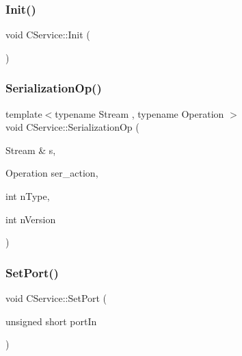 \subsubsection{\texorpdfstring{Init()}{Init()}}
{\footnotesize\ttfamily void C\+Service\+::\+Init (\begin{DoxyParamCaption}{ }\end{DoxyParamCaption})}

\mbox{\label{class_c_service_a0673ebec7bdc8558ce3fe1d63ea4d2e1}} 
\subsubsection{\texorpdfstring{Serialization\+Op()}{SerializationOp()}}
{\footnotesize\ttfamily template$<$typename Stream , typename Operation $>$ \\
void C\+Service\+::\+Serialization\+Op (\begin{DoxyParamCaption}\item[{Stream \&}]{s,  }\item[{Operation}]{ser\+\_\+action,  }\item[{int}]{n\+Type,  }\item[{int}]{n\+Version }\end{DoxyParamCaption})\hspace{0.3cm}{\ttfamily [inline]}}

\mbox{\label{class_c_service_a3dedc3f12aa21bdbf1068b054d3e3d39}} 
\subsubsection{\texorpdfstring{Set\+Port()}{SetPort()}}
{\footnotesize\ttfamily void C\+Service\+::\+Set\+Port (\begin{DoxyParamCaption}\item[{unsigned short}]{port\+In }\end{DoxyParamCaption})}

\mbox{\label{class_c_service_a77782219f5d85f326b4c089cb2636e6f}} 
